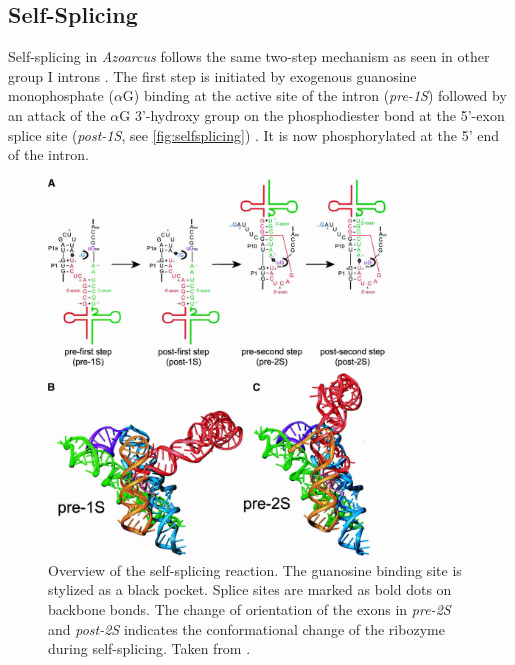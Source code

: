 \documentclass[../../master.tex]{subfiles}
\begin{document}
\subsection{Self-Splicing}
\label{sub:theory:azoarcus_selfsplicing}

Self-splicing in \textit{Azoarcus} follows the same two-step mechanism as seen in other group I introns \parencite{gleitsman_kinetic_2014}.
The first step  is initiated by exogenous guanosine monophosphate ($\alpha\mathrm{G}$) binding at the active site of the intron (\emph{pre-1S}) followed by an attack of the $\alpha\mathrm{G}$ 3'-hydroxy group on the phosphodiester bond at the 5'-exon splice site (\emph{post-1S}, see \autoref{fig:selfsplicing}) \parencite{adams_crystal_2004-1, gleitsman_kinetic_2014}.
It is now phosphorylated at the 5' end of the intron.

\begin{figure}[!ht]
	\centering
	\includegraphics[trim=0 700 0 30, clip, width=0.8\textwidth]{pic/intro/notmine/adams2004-1_fig19A.png}
	\caption[Self-Splicing of the \textit{Azoarcus} Group I Intron]{
		Overview of the self-splicing reaction. 
		The guanosine binding site is stylized as a black pocket.
		Splice sites are marked as bold dots on backbone bonds.
		The change of orientation of the exons in \emph{pre-2S} and \emph{post-2S} indicates the conformational change of the ribozyme during self-splicing.
		Taken from \parencite[Figure 19A]{adams_crystal_2004-1}.
	}\label{fig:selfsplicing}
\end{figure}
\end{document}
